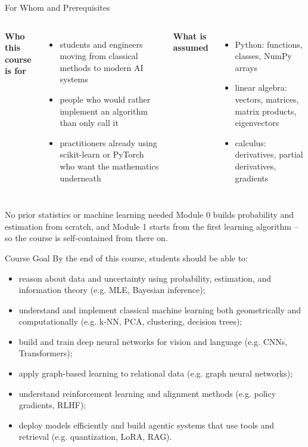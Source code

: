 
\begin{frame}{For Whom and Prerequisites}
\begin{columns}[T]
\textbf{Who this course is for}
\begin{itemize}
  \item students and engineers moving from classical methods to modern AI systems
  \pause
  \item people who would rather implement an algorithm than only call it
  \pause
  \item practitioners already using scikit-learn or PyTorch who want the mathematics underneath
\end{itemize}

\pause
{}
\textbf{What is assumed}
\begin{itemize}
  \item Python: functions, classes, NumPy arrays
  \pause
  \item linear algebra: vectors, matrices, matrix products, eigenvectors
  \pause
  \item calculus: derivatives, partial derivatives, gradients
\end{itemize}
\end{columns}

\pause
\begin{block}{No prior statistics or machine learning needed}
Module 0 builds probability and estimation from scratch, and Module 1 starts from the first learning algorithm -- so the course is self-contained from there on.
\end{block}
\end{frame}

\begin{frame}{Course Goal}
By the end of this course, students should be able to:
\begin{itemize}
  \item reason about data and uncertainty using probability, estimation, and information theory (e.g. MLE, Bayesian inference);
  \pause
  \item understand and implement classical machine learning both geometrically and computationally (e.g. k-NN, PCA, clustering, decision trees);
  \pause
  \item build and train deep neural networks for vision and language (e.g. CNNs, Transformers);
  \pause
  \item apply graph-based learning to relational data (e.g. graph neural networks);
  \pause
  \item understand reinforcement learning and alignment methods (e.g. policy gradients, RLHF);
  \pause
  \item deploy models efficiently and build agentic systems that use tools and retrieval (e.g. quantization, LoRA, RAG).
\end{itemize}
\end{frame}

